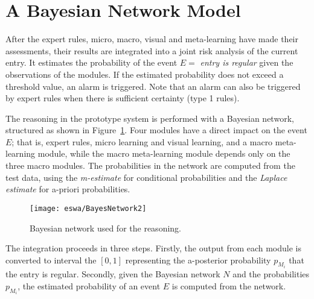 \section{A Bayesian Network Model}

After the expert rules, micro, macro, visual and meta-learning have made their assessments, their results are integrated into a joint risk analysis of the current entry. It estimates the probability of the event $E = $ \textit{entry is regular} given the observations of the modules. If the estimated probability does not exceed a threshold value, an alarm is triggered. Note that an alarm can also be triggered by expert rules when there is sufficient certainty (type 1 rules).

The reasoning in the prototype system is performed with a Bayesian network, structured as shown in Figure~\ref{fig:bayesianNetwork}. Four modules have a direct impact on the event $E$; that is, expert rules, micro learning and visual learning, and a macro meta-learning module, while the macro meta-learning module depends only on the three macro modules. The probabilities in the network are computed from the test data, using the \textit{m-estimate}  for conditional probabilities and the \textit{Laplace estimate} for a-priori probabilities. 
\begin{figure}[h]
\centering
\texttt{[image: eswa/BayesNetwork2]}
\caption{Bayesian network used for the reasoning.}
\label{fig:bayesianNetwork}
\end{figure}

The integration proceeds in three steps. Firstly, the output from each module is converted to interval the $[0, 1]$ representing the a-posterior probability $p_{M_i}$ that the entry is regular. Secondly, given the Bayesian network $N$ and the probabilities $p_{M_i}$, the estimated  probability of an event $E$ is computed from the network.

